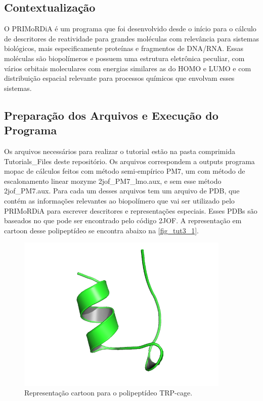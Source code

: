\documentclass[a4paper,11pt]{refart}
\begin{document}
\subsection{Contextualização}

O PRIMoRDiA é um programa que foi desenvolvido desde o início para o cálculo de descritores de reatividade para grandes moléculas com relevância para sistemas biológicos, mais especificamente proteínas e fragmentos de DNA/RNA. Essas moléculas são biopolímeros e possuem uma estrutura eletrônica peculiar, com vários orbitais moleculares com energias similares as do HOMO e LUMO e com distribuição espacial relevante para processos químicos que envolvam esses sistemas.

\subsection{Preparação dos Arquivos e Execução do Programa}

Os arquivos necessários para realizar o tutorial estão na pasta comprimida Tutorials\_Files deste repositório. Os arquivos correspondem a outputs programa mopac de cálculos feitos com método semi-empírico PM7, um com método de escalonamento linear mozyme 2jof\_PM7\_lmo.aux, e sem esse método 2jof\_PM7.aux. Para cada um desses arquivos tem um arquivo de PDB, que contém as informações relevantes ao biopolímero que vai ser utilizado pelo PRIMoRDiA para escrever descritores e representações especiais. Esses PDBs são baseados no que pode ser encontrado pelo código 2JOF. A representação em cartoon desse polipeptídeo se encontra abaixo na \autoref{fig_tut3_1}.


\hspace*{-\leftmarginwidth}
\begin{minipage}{\fullwidth}
	\begin{figure}[H]
		\begin{center}
			\includegraphics[width=4in]{images/tut3_img1}
			\caption{Representação cartoon para o polipeptídeo TRP-cage.}
			\label{fig_tut3_1}
		\end{center}
	\end{figure}
\end{minipage}
\end{document}
